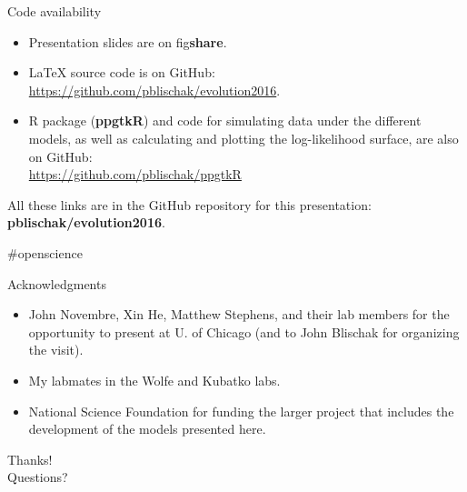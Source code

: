 \documentclass[presentation,sansserif]{beamer}
\begin{document}
\begin{frame}[t,plain]{Code availability}
	\fontsize{10pt}{10}\selectfont
	\begin{itemize}
	\setlength\itemsep{0.2in}

		\item Presentation slides are on fig\textbf{share}.
		
		\item \LaTeX{} source code is on GitHub:\\[0.05in] \url{https://github.com/pblischak/evolution2016}.
		
		\item R package (\textbf{ppgtkR}) and code for simulating data under the different models, as well as calculating and plotting the log-likelihood surface, are also on GitHub: \\[0.05in] \url{https://github.com/pblischak/ppgtkR}
		
	\end{itemize}
	\vspace{0.15in}

	{\Large \alert{All these links are in the GitHub repository for this presentation: \textbf{pblischak/evolution2016}.}}

	\hfill {\tiny \#openscience}
\end{frame}

\begin{frame}[t,plain]{Acknowledgments}
  \vspace{0.2in}

  \begin{itemize}
    \setlength\itemsep{0.3in}
    \item John Novembre, Xin He, Matthew Stephens, and their lab members for the opportunity to present at U. of Chicago (and to John Blischak for organizing the visit).
    \item My labmates in the Wolfe and Kubatko labs.
    \item National Science Foundation for funding the larger project that includes the development of the models presented here.
  \end{itemize}

\end{frame}

\begin{frame}[c,plain]{}
	\begin{center}
		{\Huge Thanks!}\\
		\vspace{0.5in}
		{\LARGE Questions?}
	\end{center}
\end{frame}
\end{document}
